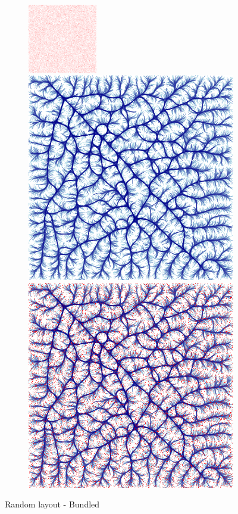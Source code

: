 \documentclass[12pt, a4paper]{article}
\begin{document}
\begin{figure}[H]
    \centering
    \begin{subfigure}[b]{\textwidth}
        \centering
        \includegraphics[width=0.33\textwidth]{src/youtube/datashader/simple/datashader/5_1}%
        \hfill
        \includegraphics[width=0.33\columnwidth]{src/youtube/datashader/simple/datashader/5_2}%
        \hfill
        \includegraphics[width=0.33\columnwidth]{src/youtube/datashader/simple/datashader/5_3}
    \end{subfigure}
    \caption{Random layout - Bundled}
    \label{fig:ds_show_5}
\end{figure}
\end{document}
